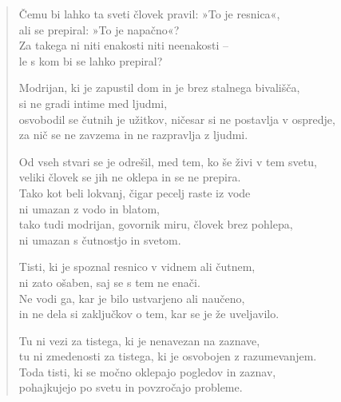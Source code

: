 \clearpage
\begin{verse}

Čemu bi lahko ta sveti človek pravil: »To je resnica«,\\
ali se prepiral: »To je napačno«?\\
Za takega ni niti enakosti niti neenakosti --\\
le s kom bi se lahko prepiral?

Modrijan, ki je zapustil dom in je brez stalnega bivališča,\\
si ne gradi intime med ljudmi,\\
osvobodil se čutnih je užitkov, ničesar si ne postavlja v ospredje,\\
za nič se ne zavzema in ne razpravlja z ljudmi.

Od vseh stvari se je odrešil, med tem, ko še živi v tem svetu,\\
veliki človek se jih ne oklepa in se ne prepira.\\
Tako kot beli lokvanj, čigar pecelj raste iz vode\\
ni umazan z vodo in blatom,\\
tako tudi modrijan, govornik miru, človek brez pohlepa,\\
ni umazan s čutnostjo in svetom.

Tisti, ki je spoznal resnico v vidnem ali čutnem,\\
ni zato ošaben, saj se s tem ne enači.\\
Ne vodi ga, kar je bilo ustvarjeno ali naučeno,\\
in ne dela si zaključkov o tem, kar se je že uveljavilo.

Tu ni vezi za tistega, ki je nenavezan na zaznave,\\
tu ni zmedenosti za tistega, ki je osvobojen z razumevanjem.\\
Toda tisti, ki se močno oklepajo pogledov in zaznav,\\
pohajkujejo po svetu in povzročajo probleme.

\end{verse}

